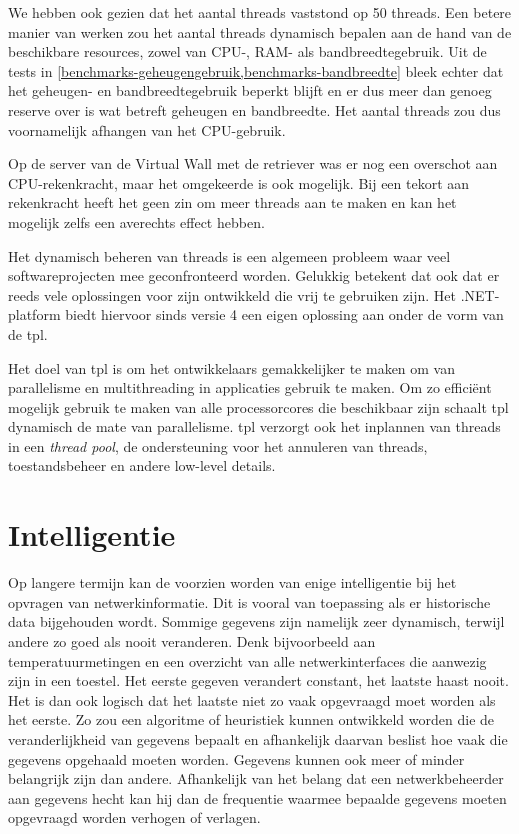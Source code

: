 We hebben ook gezien dat het aantal threads vaststond op 50 threads.
Een betere manier van werken zou het aantal threads dynamisch bepalen aan de hand van de beschikbare resources, zowel van CPU-, RAM- als bandbreedtegebruik.
Uit de tests in \cref{benchmarks-geheugengebruik,benchmarks-bandbreedte} bleek echter dat het geheugen- en bandbreedtegebruik beperkt blijft
en er dus meer dan genoeg reserve over is wat betreft geheugen en bandbreedte.
Het aantal threads zou dus voornamelijk afhangen van het CPU-gebruik.

Op de server van de Virtual Wall met de retriever was er nog een overschot aan CPU-rekenkracht,
maar het omgekeerde is ook mogelijk.
Bij een tekort aan rekenkracht heeft het geen zin om meer threads aan te maken en kan het mogelijk zelfs een averechts effect hebben.

Het dynamisch beheren van threads is een algemeen probleem waar veel softwareprojecten mee geconfronteerd worden.
Gelukkig betekent dat ook dat er reeds vele oplossingen voor zijn ontwikkeld die vrij te gebruiken zijn.
Het .NET-platform biedt hiervoor sinds versie 4 een eigen oplossing aan onder de vorm van de \gls{tpl}.

Het doel van \gls{tpl} is om het ontwikkelaars gemakkelijker te maken om van parallelisme en multithreading in applicaties gebruik te maken.
Om zo efficiënt mogelijk gebruik te maken van alle processorcores die beschikbaar zijn schaalt \gls{tpl} dynamisch de mate van parallelisme.
\Gls{tpl} verzorgt ook het inplannen van threads in een \textit{thread pool}, de ondersteuning voor het annuleren van threads, toestandsbeheer en
andere low-level details\cite{msdn-tpl}.


\section{Intelligentie}

Op langere termijn kan de \nwmretriever{} voorzien worden van enige intelligentie bij het opvragen van netwerkinformatie.
Dit is vooral van toepassing als er historische data bijgehouden wordt.
Sommige gegevens zijn namelijk zeer dynamisch, terwijl andere zo goed als nooit veranderen.
Denk bijvoorbeeld aan temperatuurmetingen en een overzicht van alle netwerkinterfaces die aanwezig zijn in een toestel.
Het eerste gegeven verandert constant, het laatste haast nooit.
Het is dan ook logisch dat het laatste niet zo vaak opgevraagd moet worden als het eerste.
Zo zou een algoritme of heuristiek kunnen ontwikkeld worden die de veranderlijkheid van gegevens bepaalt en afhankelijk daarvan
beslist hoe vaak die gegevens opgehaald moeten worden.
Gegevens kunnen ook meer of minder belangrijk zijn dan andere.
Afhankelijk van het belang dat een netwerkbeheerder aan gegevens hecht kan hij dan de frequentie waarmee bepaalde gegevens moeten opgevraagd worden verhogen of verlagen.



